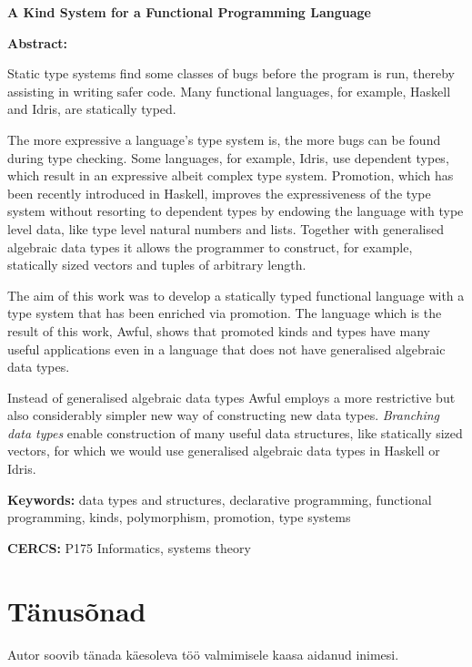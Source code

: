 \documentclass[12pt]{article}
\newcommand\peatykktarn[1]{
  \clearpage
  \section*{#1}
  \addcontentsline{toc}{section}{#1}}
\begin{document}
  {
    \noindent
    \textbf{\large A Kind System for a Functional Programming Language}

    \vspace*{1ex}

    \noindent
    \textbf{Abstract:}

    \noindent
    Static type systems find some classes of bugs before the program is run, thereby assisting in writing safer code. Many functional languages, for example, Haskell and Idris, are statically typed.

    The more expressive a language's type system is, the more bugs can be found during type checking. Some languages, for example, Idris, use dependent types, which result in an expressive albeit complex type system. Promotion, which has been recently introduced in Haskell, improves the expressiveness of the type system without resorting to dependent types by endowing the language with type level data, like type level natural numbers and lists. Together with generalised algebraic data types it allows the programmer to construct, for example, statically sized vectors and tuples of arbitrary length.

    The aim of this work was to develop a statically typed functional language with a type system that has been enriched via promotion. The language which is the result of this work, Awful, shows that promoted kinds and types have many useful applications even in a language that does not have generalised algebraic data types.

    Instead of generalised algebraic data types Awful employs a more restrictive but also considerably simpler new way of constructing new data types. \textit{Branching data types} enable construction of many useful data structures, like statically sized vectors, for which we would use generalised algebraic data types in Haskell or Idris.

    \vspace*{1ex}

    \noindent
    \textbf{Keywords:} data types and structures, declarative programming, functional programming, kinds, polymorphism, promotion, type systems

    \vspace*{1ex}

    \noindent
    \textbf{CERCS:} P175 Informatics, systems theory

    \vspace*{1ex}}
  \newpage
  \tableofcontents
  \peatykktarn{Tänusõnad}
    Autor soovib tänada käesoleva töö valmimisele kaasa aidanud inimesi.
\end{document}
